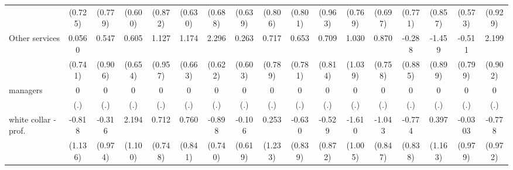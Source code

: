 {\begin{tabular}{l*{16}{c}}
                    &     (0.725)         &     (0.779)         &     (0.600)         &     (0.872)         &     (0.630)         &     (0.688)         &     (0.639)         &     (0.806)         &     (0.801)         &     (0.963)         &     (0.769)         &     (0.697)         &     (0.771)         &     (0.857)         &     (0.573)         &     (0.929)         \\
[1em]
Other services      &      0.0560         &       0.547         &       0.605         &       1.127         &       1.174         &       2.296\sym{***}&       0.263         &       0.717         &       0.653         &       0.709         &       1.030         &       0.870         &      -0.288         &      -1.459         &      -0.511         &       2.199\sym{*}  \\
                    &     (0.741)         &     (0.906)         &     (0.654)         &     (0.957)         &     (0.663)         &     (0.622)         &     (0.603)         &     (0.789)         &     (0.781)         &     (0.814)         &     (1.039)         &     (0.758)         &     (0.885)         &     (0.899)         &     (0.799)         &     (0.902)         \\
[1em]
managers            &           0         &           0         &           0         &           0         &           0         &           0         &           0         &           0         &           0         &           0         &           0         &           0         &           0         &           0         &           0         &           0         \\
                    &         (.)         &         (.)         &         (.)         &         (.)         &         (.)         &         (.)         &         (.)         &         (.)         &         (.)         &         (.)         &         (.)         &         (.)         &         (.)         &         (.)         &         (.)         &         (.)         \\
[1em]
white collar - prof.&      -0.818         &      -0.316         &       2.194\sym{*}  &       0.712         &       0.760         &      -0.898         &      -0.106         &       0.253         &      -0.630         &      -0.529         &      -1.610         &      -1.043         &      -0.774         &       0.397         &     -0.0303         &      -0.778         \\
                    &     (1.136)         &     (0.974)         &     (1.100)         &     (0.748)         &     (0.841)         &     (0.740)         &     (0.619)         &     (1.233)         &     (0.839)         &     (0.872)         &     (1.005)         &     (0.847)         &     (0.838)         &     (1.163)         &     (0.979)         &     (0.972)         \\

\end{tabular}}
